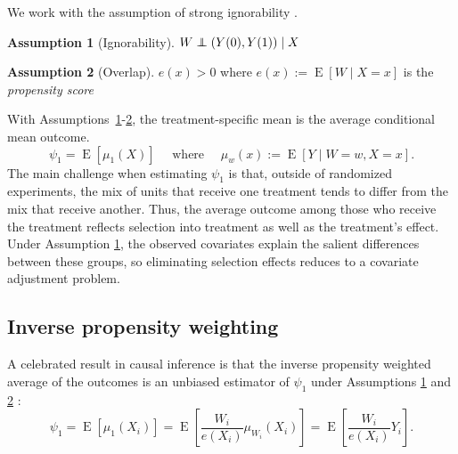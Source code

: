 \documentclass{article}
\theoremstyle{definition}
\newtheorem{assumption}{Assumption}
\newcommand\indep{\protect\mathpalette{\protect\independenT}{\perp}}
\def\independenT#1#2{\mathrel{\rlap{$#1#2$}\mkern2mu{#1#2}}}
\DeclareMathOperator{\E}{E}
\newcommand{\<}{\langle}
\renewcommand{\>}{\rangle}
\begin{document}
We work with the assumption of strong ignorability \citep{Rosenbaum1983}.
\begin{assumption}[Ignorability]
  \label{a:ignore}
  $W \indep (Y(0), Y(1))\mid X$
\end{assumption}

\begin{assumption}[Overlap]
  \label{a:overlap}
  $e(x) > 0$ where $e(x) := \E[W \mid X = x]$ is the \emph{propensity score}
\end{assumption}

\noindent With  Assumptions~\ref{a:ignore}-\ref{a:overlap}, the treatment-specific mean is the average conditional mean outcome.%
\begin{equation}
 \label{eq_identification}
\psi_1 = \E[\mu_1(X)] \quad \text{ where } \quad \mu_w(x) := \E[Y \mid W=w, X = x].
 \end{equation}
The main challenge when estimating $\psi_1$ is that, outside of randomized experiments,
the mix of units that receive one treatment tends to differ from the mix that receive another.
Thus, the average outcome among those who receive the treatment reflects selection into treatment as well as the treatment's effect.
Under Assumption \ref{a:ignore}, the observed covariates explain the salient differences between these groups, %
so eliminating selection effects reduces to a covariate adjustment problem.




\vspace{-.3cm}
\subsection{Inverse propensity weighting}
\label{sec:true_ipw}

A celebrated result in causal inference is that the inverse propensity weighted average of the outcomes is an unbiased estimator of $\psi_1$ under Assumptions \ref{a:ignore} and \ref{a:overlap} \citep{rosenbaum1987model}:
\begin{equation}
  \label{eq_mipw-identity}
  \psi_1 = \E\left[\mu_1(X_i)\right] =  \E\left[\frac{W_i}{e(X_i)} \mu_{W_i}(X_i)\right] = \E\left[\frac{W_i}{e(X_i)} Y_i \right].
\end{equation}
\end{document}
